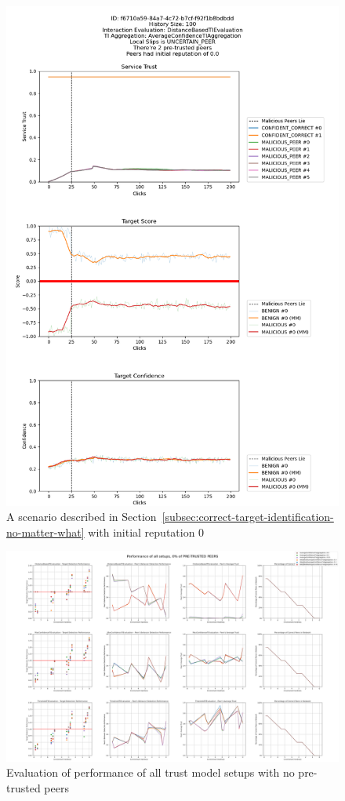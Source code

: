 \begin{figure}
    \centering
    \includegraphics[width=1.0\textwidth]{assets/best_worst_case}
    \caption{A scenario described in Section~\ref{subsec:correct-target-identification-no-matter-what} with initial reputation 0}
    \label{fig:worst-best-scenario}
\end{figure}

\begin{figure}
    \centering
    \includegraphics[width=0.9\paperwidth, angle=90]{assets/0_all_metrics.png}
    \caption{Evaluation of performance of all trust model setups with no pre-trusted peers}
    \label{fig:performance-all-setups-0-pretrusted}
\end{figure}

